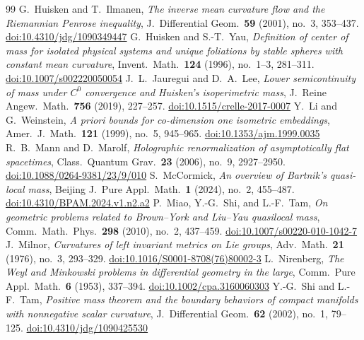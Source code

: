 \documentclass[10pt,a4paper]{amsart}
\begin{document}
\begin{thebibliography}{99}
 G.~Huisken and T.~Ilmanen, \emph{The inverse mean curvature flow and the Riemannian Penrose inequality}, J.\ Differential Geom.\ \textbf{59} (2001), no.~3, 353--437. \href{https://doi.org/10.4310/jdg/1090349447}{doi:10.4310/jdg/1090349447}
 G.~Huisken and S.-T.~Yau, \emph{Definition of center of mass for isolated physical systems and unique foliations by stable spheres with constant mean curvature}, Invent.\ Math.\ \textbf{124} (1996), no.~1--3, 281--311. \href{https://doi.org/10.1007/s002220050054}{doi:10.1007/s002220050054}
 J.~L.~Jauregui and D.~A.~Lee, \emph{Lower semicontinuity of mass under $C^0$ convergence and Huisken's isoperimetric mass}, J.\ Reine Angew.\ Math.\ \textbf{756} (2019), 227--257. \href{https://doi.org/10.1515/crelle-2017-0007}{doi:10.1515/crelle-2017-0007}
 Y.~Li and G.~Weinstein, \emph{A priori bounds for co-dimension one isometric embeddings}, Amer.\ J.\ Math.\ \textbf{121} (1999), no.~5, 945--965. \href{https://doi.org/10.1353/ajm.1999.0035}{doi:10.1353/ajm.1999.0035}
 R.~B.~Mann and D.~Marolf, \emph{Holographic renormalization of asymptotically flat spacetimes}, Class.\ Quantum Grav.\ \textbf{23} (2006), no.~9, 2927--2950. \href{https://doi.org/10.1088/0264-9381/23/9/010}{doi:10.1088/0264-9381/23/9/010}
 S.~McCormick, \emph{An overview of Bartnik's quasi-local mass}, Beijing J.\ Pure Appl.\ Math.\ \textbf{1} (2024), no.~2, 455--487. \href{https://doi.org/10.4310/BPAM.2024.v1.n2.a2}{doi:10.4310/BPAM.2024.v1.n2.a2}
 P.~Miao, Y.-G.~Shi, and L.-F.~Tam, \emph{On geometric problems related to Brown--York and Liu--Yau quasilocal mass}, Comm.\ Math.\ Phys.\ \textbf{298} (2010), no.~2, 437--459. \href{https://doi.org/10.1007/s00220-010-1042-7}{doi:10.1007/s00220-010-1042-7}
 J.~Milnor, \emph{Curvatures of left invariant metrics on Lie groups}, Adv.\ Math.\ \textbf{21} (1976), no.~3, 293--329. \href{https://doi.org/10.1016/S0001-8708(76)80002-3}{doi:10.1016/S0001-8708(76)80002-3}
 L.~Nirenberg, \emph{The Weyl and Minkowski problems in differential geometry in the large}, Comm.\ Pure Appl.\ Math.\ \textbf{6} (1953), 337--394. \href{https://doi.org/10.1002/cpa.3160060303}{doi:10.1002/cpa.3160060303}
 Y.-G.~Shi and L.-F.~Tam, \emph{Positive mass theorem and the boundary behaviors of compact manifolds with nonnegative scalar curvature}, J.\ Differential Geom.\ \textbf{62} (2002), no.~1, 79--125. \href{https://doi.org/10.4310/jdg/1090425530}{doi:10.4310/jdg/1090425530}

\end{thebibliography}
\end{document}
